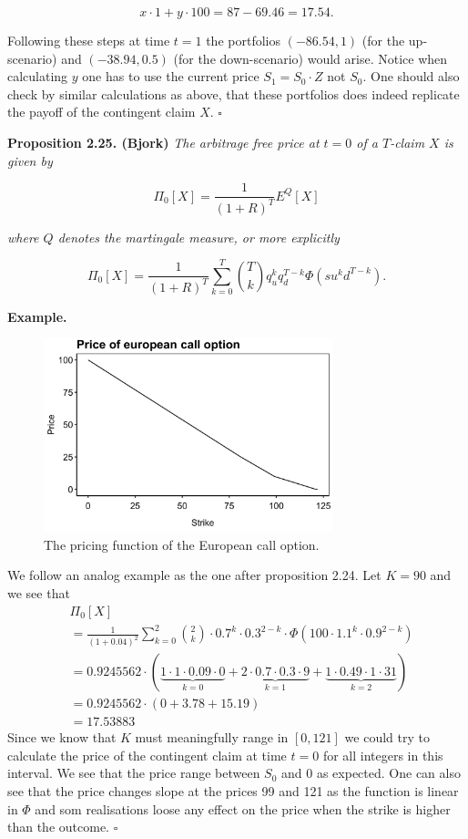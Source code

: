 \documentclass[
]{book}
\begin{document}
\[
x\cdot 1+y\cdot100=87-69.46=17.54.
\]

Following these steps at time \(t=1\) the portfolios \((-86.54,1)\) (for the up-scenario) and \((-38.94,0.5)\) (for the down-scenario) would arise. Notice when calculating \(y\) one has to use the current price \(S_1=S_0\cdot Z\) not \(S_0\). One should also check by similar calculations as above, that these portfolios does indeed replicate the payoff of the contingent claim \(X\). \(\square\)

\textbf{Proposition 2.25. (Bjork)} \emph{The arbitrage free price at \(t=0\) of a \(T\)-claim \(X\) is given by}

\[
\Pi_0[X]=\frac{1}{(1+R)^T}E^Q[X]
\]

\emph{where \(Q\) denotes the martingale measure, or more explicitly}

\[
\Pi_0[X]=\frac{1}{(1+R)^T}\sum_{k=0}^T\binom{T}{k}q_u^kq_d^{T-k}\Phi(su^kd^{T-k}).
\]

\textbf{Example.}

\begin{figure}[H]
  \begin{center}
    \includegraphics[width=0.75\textwidth]{figures/BS_call_price.png}
  \end{center}
  \caption{The pricing function of the European call option.}
\end{figure}

We follow an analog example as the one after proposition 2.24. Let \(K=90\) and we see that
\begin{align*}
&\Pi_0[X]\\
&=\frac{1}{(1+0.04)^2}\sum_{k=0}^2\binom{2}{k}\cdot0.7^k\cdot0.3^{2-k}\cdot\Phi(100\cdot 1.1^k\cdot0.9^{2-k})\\
&=0.9245562\cdot\left(\underbrace{1\cdot 1\cdot0.09\cdot0}_{k=0}+\underbrace{2\cdot 0.7\cdot0.
3\cdot 9}_{k=1}+\underbrace{1\cdot 0.49\cdot1\cdot31}_{k=2}\right)\\
&=0.9245562\cdot\left(0+3.78+15.19\right)\\
&=17.53883
\end{align*}
Since we know that \(K\) must meaningfully range in \([0,121]\) we could try to calculate the price of the contingent claim at time \(t=0\) for all integers in this interval. We see that the price range between \(S_0\) and 0 as expected. One can also see that the price changes slope at the prices 99 and 121 as the function is linear in \(\Phi\) and som realisations loose any effect on the price when the strike is higher than the outcome. \(\square\)
\end{document}
